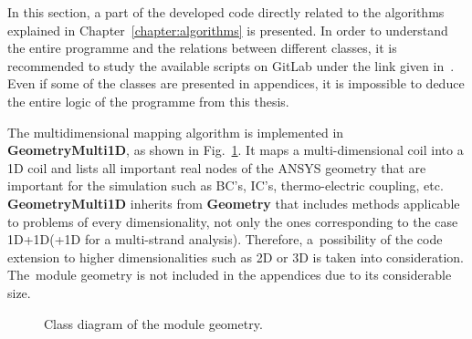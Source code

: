 
In this section, a part of the developed code directly related to the algorithms explained in Chapter~\ref{chapter:algorithms} is presented. In order to understand the entire programme and the relations between different classes, it is recommended to study the available scripts on GitLab under the link given in~\cite{my_python_code}. Even if some of the classes are presented in appendices, it is impossible to deduce the entire logic of the programme from this thesis. 

The multidimensional mapping algorithm is implemented in \textbf{GeometryMulti1D}, as shown in Fig.~\ref{fig:geometry_oop}. It maps a multi-dimensional coil into a 1D coil and lists all important real nodes of the ANSYS geometry that are important for the simulation such as BC's, IC's, thermo-electric coupling, etc. \textbf{GeometryMulti1D} inherits from \textbf{Geometry} that includes methods applicable to problems of every dimensionality, not only the ones corresponding to the case 1D+1D(+1D for a multi-strand analysis). Therefore, a~possibility of the code extension to higher dimensionalities such as 2D or 3D is taken into consideration. The~module geometry is not included in the appendices due to its considerable size. 

\begin{figure}[H]
    \centering
    \caption{Class diagram of the module geometry.}
    \label{fig:geometry_oop}
\end{figure}

